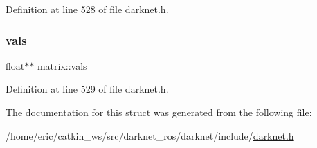 Definition at line 528 of file darknet.\+h.

\mbox{\label{structmatrix_ac06cdc346e87ea5cb4e4ae1a9b91d61f}} 
\subsubsection{\texorpdfstring{vals}{vals}}
{\footnotesize\ttfamily float$\ast$$\ast$ matrix\+::vals}



Definition at line 529 of file darknet.\+h.



The documentation for this struct was generated from the following file\+:\begin{DoxyCompactItemize}
\item 
/home/eric/catkin\+\_\+ws/src/darknet\+\_\+ros/darknet/include/\mbox{\hyperlink{darknet_8h}{darknet.\+h}}\end{DoxyCompactItemize}
